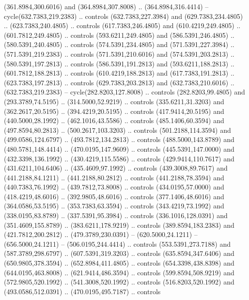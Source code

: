 {{\begin{scope}[y=-0.80pt,x=0.80pt,scale=0.038,xshift=-375pt,yshift=220pt]
        (361.8984,300.6016) and (364.8984,307.8008) .. (364.8984,316.4414) --
        cycle(632.7383,219.2383) .. controls (632.7383,227.3984) and
        (629.7383,234.4805) .. (623.7383,240.4805) .. controls (617.7383,246.4805) and
        (610.4219,249.4805) .. (601.7812,249.4805) .. controls (593.6211,249.4805) and
        (586.5391,246.4805) .. (580.5391,240.4805) .. controls (574.5391,234.4805) and
        (571.5391,227.3984) .. (571.5391,219.2383) .. controls (571.5391,210.6016) and
        (574.5391,203.2813) .. (580.5391,197.2813) .. controls (586.5391,191.2813) and
        (593.6211,188.2813) .. (601.7812,188.2813) .. controls (610.4219,188.2813) and
        (617.7383,191.2813) .. (623.7383,197.2813) .. controls (629.7383,203.2813) and
        (632.7383,210.6016) .. (632.7383,219.2383) -- cycle(282.8203,127.8008) ..
        controls (282.8203,99.4805) and (293.3789,74.5195) .. (314.5000,52.9219) ..
        controls (335.6211,31.3203) and (362.2617,20.5195) .. (394.4219,20.5195) ..
        controls (417.9414,20.5195) and (440.5000,28.1992) .. (462.1016,43.5586) ..
        controls (485.1406,60.3594) and (497.8594,80.2813) .. (500.2617,103.3203) ..
        controls (501.2188,114.3594) and (499.0586,124.6797) .. (493.7812,134.2813) ..
        controls (488.5000,143.8789) and (480.5781,148.4414) .. (470.0195,147.9609) ..
        controls (445.5391,147.0000) and (432.3398,136.1992) .. (430.4219,115.5586) ..
        controls (429.9414,110.7617) and (431.6211,104.6406) .. (435.4609,97.1992) ..
        controls (439.3008,89.7617) and (441.2188,84.1211) .. (441.2188,80.2812) ..
        controls (441.2188,78.3594) and (440.7383,76.1992) .. (439.7812,73.8008) ..
        controls (434.0195,57.0000) and (418.4219,48.6016) .. (392.9805,48.6016) ..
        controls (377.1406,48.6016) and (364.0586,53.5195) .. (353.7383,63.3594) ..
        controls (343.4219,73.1992) and (338.0195,83.8789) .. (337.5391,95.3984) ..
        controls (336.1016,128.0391) and (351.4609,155.8789) .. (383.6211,178.9219) ..
        controls (389.8594,183.2383) and (421.7812,200.2812) .. (479.3789,230.0391) --
        (620.5000,24.1211) -- (656.5000,24.1211) -- (506.0195,244.4414) .. controls
        (553.5391,273.7188) and (587.3789,298.6797) .. (607.5391,319.3203) .. controls
        (635.8594,347.6406) and (650.9805,378.3594) .. (652.8984,411.4805) .. controls
        (654.3398,438.8398) and (644.0195,463.8008) .. (621.9414,486.3594) .. controls
        (599.8594,508.9219) and (572.9805,520.1992) .. (541.3008,520.1992) .. controls
        (516.8203,520.1992) and (493.0586,512.0391) .. (470.0195,495.7187) .. controls

\end{scope}}}
